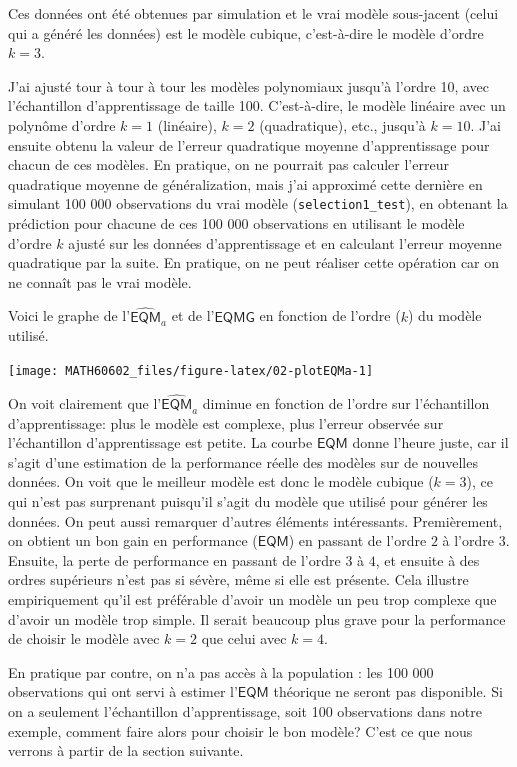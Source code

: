 \documentclass[
  11pt,
  letterpaper,
]{book}
\theoremstyle{definition}
\theoremstyle{definition}
\theoremstyle{definition}
\theoremstyle{remark}
\begin{document}
Ces données ont été obtenues par simulation et le vrai modèle sous-jacent (celui qui a généré les données) est le modèle cubique, c'est-à-dire le modèle d'ordre \(k=3\).

J'ai ajusté tour à tour à tour les modèles polynomiaux jusqu'à l'ordre 10, avec l'échantillon d'apprentissage de taille 100. C'est-à-dire, le modèle linéaire avec un polynôme d'ordre \(k=1\) (linéaire), \(k=2\) (quadratique), etc., jusqu'à \(k=10\). J'ai ensuite obtenu la valeur de l'erreur quadratique moyenne d'apprentissage pour chacun de ces modèles. En pratique, on ne pourrait pas calculer l'erreur quadratique moyenne de généralization, mais j'ai approximé cette dernière en simulant 100 000 observations du vrai modèle (\texttt{selection1\_test}), en obtenant la prédiction pour chacune de ces 100 000 observations en utilisant le modèle d'ordre \(k\) ajusté sur les données d'apprentissage et en calculant l'erreur moyenne quadratique par la suite. En pratique, on ne peut réaliser cette opération car on ne connaît pas le vrai modèle.

Voici le graphe de l'\(\widehat{\mathsf{EQM}}_a\) et de l'\(\mathsf{EQMG}\) en fonction de l'ordre (\(k\)) du modèle utilisé.

\begin{center}\texttt{[image: MATH60602\_files/figure-latex/02-plotEQMa-1]} \end{center}

On voit clairement que l'\(\widehat{\mathsf{EQM}}_a\) diminue en fonction de l'ordre sur l'échantillon d'apprentissage: plus le modèle est complexe, plus l'erreur observée sur l'échantillon d'apprentissage est petite. La courbe \(\mathsf{EQM}\) donne l'heure juste, car il s'agit d'une estimation de la performance réelle des modèles sur de nouvelles données. On voit que le meilleur modèle est donc le modèle cubique (\(k=3\)), ce qui n'est pas surprenant puisqu'il s'agit du modèle que utilisé pour générer les données. On peut aussi remarquer d'autres éléments intéressants. Premièrement, on obtient un bon gain en performance (\(\mathsf{EQM}\)) en passant de l'ordre \(2\) à l'ordre \(3\). Ensuite, la perte de performance en passant de l'ordre \(3\) à \(4\), et ensuite à des ordres supérieurs n'est pas si sévère, même si elle est présente. Cela illustre empiriquement qu'il est préférable d'avoir un modèle un peu trop complexe que d'avoir un modèle trop simple. Il serait beaucoup plus grave pour la performance de choisir le modèle avec \(k=2\) que celui avec \(k=4\).

En pratique par contre, on n'a pas accès à la population : les 100 000 observations qui ont servi à estimer l'\(\mathsf{EQM}\) théorique ne seront pas disponible. Si on a seulement l'échantillon d'apprentissage, soit 100 observations dans notre exemple, comment faire alors pour choisir le bon modèle? C'est ce que nous verrons à partir de la section suivante.
\end{document}
